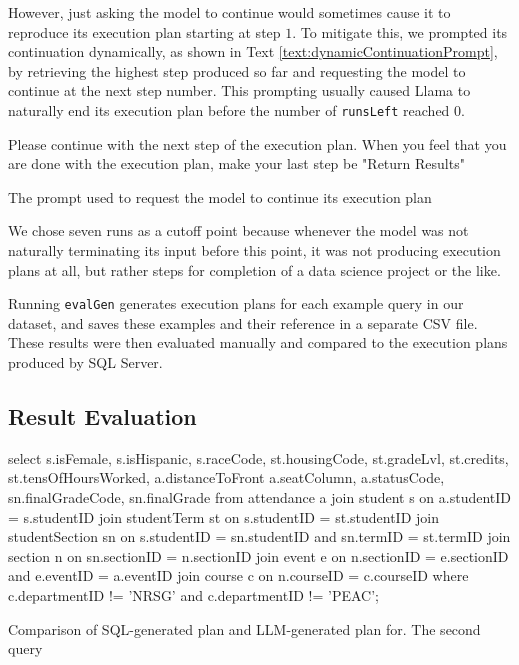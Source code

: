 However, just asking the model to continue would sometimes cause it to reproduce its execution plan starting at step $1$. To mitigate this, we prompted its continuation dynamically, as shown in Text \ref{text:dynamicContinuationPrompt}, by retrieving the highest step produced so far and requesting the model to continue at the next step number. This prompting usually caused Llama to naturally end its execution plan before the number of \lstinline{runsLeft} reached $0$.

\begin{text}
  Please continue with the next step of the execution plan. When you feel that you are done with the execution plan, make your last step be "Return Results"
  \caption{The prompt used to request the model to continue its execution plan}
  \label{text:dynamicContinuationPrompt}
\end{text}

We chose seven runs as a cutoff point because whenever the model was not naturally terminating its input before this point, it was not producing execution plans at all, but rather steps for completion of a data science project or the like.

Running \lstinline{evalGen} generates execution plans for each example query in our dataset, and saves these examples and their reference in a separate CSV file. These results were then evaluated manually and compared to the execution plans produced by SQL Server.

\subsection{Result Evaluation}
\begin{text}
  \ContinuedFloat*
  select s.isFemale, s.isHispanic, s.raceCode, st.housingCode, st.gradeLvl, st.credits, st.tensOfHoursWorked, a.distanceToFront a.seatColumn, a.statusCode, sn.finalGradeCode, sn.finalGrade from attendance a join student s on a.studentID = s.studentID join studentTerm st on s.studentID = st.studentID join studentSection sn on s.studentID = sn.studentID and sn.termID = st.termID join section n on sn.sectionID = n.sectionID join event e on n.sectionID = e.sectionID and e.eventID = a.eventID join course c on n.courseID = c.courseID where c.departmentID != 'NRSG' and c.departmentID != 'PEAC';
  \caption{Comparison of SQL-generated plan and LLM-generated plan for. The second query}
  \label{text:sqlVsLlamaPlan2}
\end{text}

